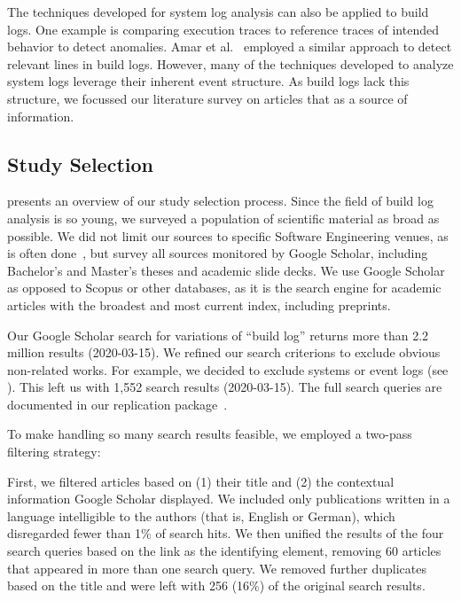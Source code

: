 The techniques developed for system log analysis can also be applied
to build logs.
One example is comparing execution traces to reference
traces of intended behavior to detect anomalies.
Amar et
al.~\cite{amar2019mining} employed a similar approach to detect
relevant lines in build logs.
However, many of the techniques developed to analyze system logs
leverage their inherent event structure.
As build logs lack this structure, we focussed our literature
survey on articles that as a source of information.


\subsection{Study Selection}
 presents an overview of our study selection
process.
Since the field of build log analysis is so young, we
surveyed a population of scientific material as broad as possible.
We did not limit our sources to specific Software Engineering venues, as
is often done~\cite{petersen2015guidelines}, but survey all sources
monitored by Google Scholar, including Bachelor's and Master's
theses and academic slide decks.
We use Google Scholar as opposed to Scopus or
other databases, as it is the search engine for academic articles with
the broadest and most current index, including preprints.

Our Google Scholar search for variations of ``build log''
returns more than 2.2 million results (2020-03-15).
We refined our search criterions to exclude obvious
non-related works.
For example, we decided to exclude systems
or event logs (see ).
This left us with 1,552 search results
(2020-03-15).
The full search queries are documented in our replication
package~\cite{brandt2020chunk-replication}.

To make handling so many search results feasible, we employed a
two-pass filtering strategy:

First, we filtered articles based on (1) their title and (2) the
contextual information Google Scholar displayed.
We included only
publications written in a language intelligible to the authors (that
is, English or German), which disregarded fewer than 1\% of search
hits.
We then unified
the results of the four search queries based on the link as the
identifying element, removing 60 articles that appeared in more than
one search query.
We removed further duplicates based on the title and were
left with 256 (16\%) of the original search results.

